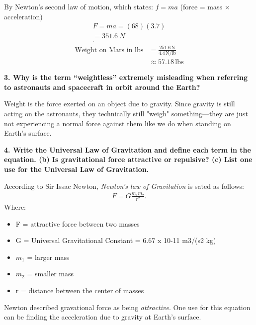 \documentclass{report}
\begin{document}
    By Newton's second law of motion, which states: $f = ma$ (force = mass $\times$ acceleration)
    \begin{align*}
        F = ma = (68)(3.7) \\
        = 351.6\ N \\
    .\end{align*}
    \begin{align*}
    \text{Weight on Mars in lbs} &= \frac{251.6 \, \text{N}}{4.4 \, \text{N/lb}} \\
    &\approx 57.18 \, \text{lbs}
    \end{align*}

    \bigbreak \noindent 
    \begin{mdframed}
        \textbf{3. Why is the term “weightless” extremely misleading when referring to astronauts and spacecraft in orbit around the Earth?}
    \end{mdframed}
    \bigbreak \noindent 
    
    Weight is the force exerted on an object due to gravity. Since gravity is still acting on the astronauts, they technically still "weigh" something—they are just not experiencing a normal force against them like we do when standing on Earth's surface.

    \pagebreak 
    \begin{mdframed}
        \textbf{4. Write the Universal Law of Gravitation and define each term in the equation. (b) Is gravitational force attractive or repulsive? (c) List one use for the Universal Law of Gravitation.}
    \end{mdframed}
    \bigbreak \noindent 
    According to Sir Issac Newton, \textit{Newton's law of Gravitation} is sated as follows:
    \begin{align*}
        F = G\frac{m_{1}m_{2}}{r^{2}}
    .\end{align*}
    \bigbreak \noindent 
    Where:
    \begin{itemize}
        \item  F = attractive force between two masses 
        \item  G = Universal Gravitational Constant = 6.67 x 10-11 m3/(s2 kg)
        \item  $m_{1}$ = larger mass
        \item  $m_{2}$ = smaller mass
        \item  r = distance between the center of masses
    \end{itemize}
    \bigbreak \noindent 
    Newton described gravational force as being \textit{attractive}. One use for this equation can be finding the acceleration due to gravity at Earth's surface.
\end{document}

